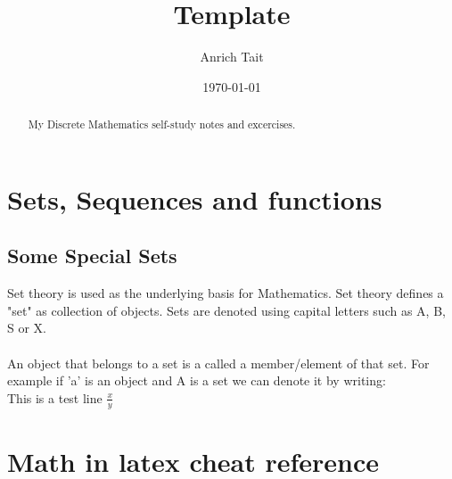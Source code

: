 \documentclass[12pt, letterpaper]{report}
\title{Template}
\author{Anrich Tait}
\date{\today}
\begin{document}
\restoregeometry %
\nopagecolor%

\tableofcontents
\begin{abstract}
My Discrete Mathematics self-study notes and excercises.
\end{abstract}

\chapter{Sets, Sequences and functions}

\section{Some Special Sets}
Set theory is used as the underlying basis for Mathematics.
Set theory defines a "set" as collection of objects. Sets are denoted using 
capital letters such as A, B, S or X.\\\\

An object that belongs to a set is a called a member/element of that set. For 
example if 'a' is an object and A is a set we can denote it by writing:\\

This is a test line $\frac{x}{y}$









\chapter{Math in latex cheat reference}
\end{document}
